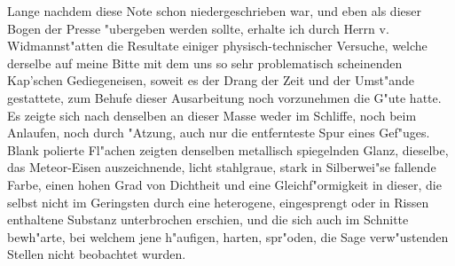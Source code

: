 \documentclass[a4paper, 11pt, oneside, german]{article}
\begin{document}
{\hspace*{6mm}Lange nachdem diese Note schon niedergeschrieben war, und eben als dieser Bogen der Presse "ubergeben werden sollte, erhalte ich durch Herrn v. Widmannst"atten die Resultate einiger physisch-technischer Versuche, welche derselbe auf meine Bitte mit dem uns so sehr problematisch scheinenden Kap’schen Gediegeneisen, soweit es der Drang der Zeit und der Umst"ande gestattete, zum Behufe dieser Ausarbeitung noch vorzunehmen die G"ute hatte. Es zeigte sich nach denselben an dieser Masse weder im Schliffe, noch beim Anlaufen, noch durch "Atzung, auch nur die entfernteste Spur eines Gef"uges.\\
Blank polierte Fl"achen zeigten denselben metallisch spiegelnden Glanz, dieselbe, das Meteor-Eisen auszeichnende, licht stahlgraue, stark in Silberwei"se fallende Farbe, einen hohen Grad von Dichtheit und eine Gleichf"ormigkeit in dieser, die selbst nicht im Geringsten durch eine heterogene, eingesprengt oder in Rissen enthaltene Substanz unterbrochen erschien, und die sich auch im Schnitte bewh"arte, bei welchem jene h"aufigen, harten, spr"oden, die Sage verw"ustenden Stellen nicht beobachtet wurden.\\
}
\end{document}

